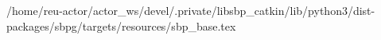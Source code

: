 /home/reu-actor/actor_ws/devel/.private/libsbp_catkin/lib/python3/dist-packages/sbpg/targets/resources/sbp_base.tex